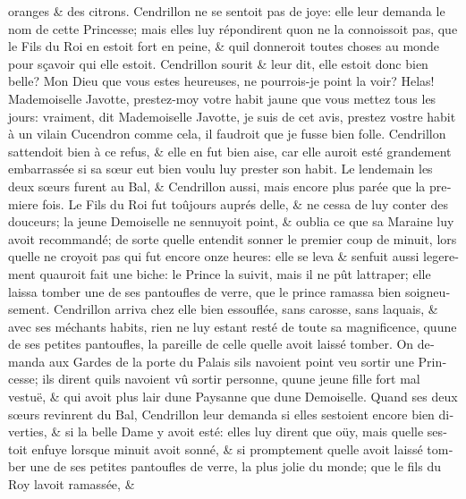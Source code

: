 \documentclass[14pt,a4paper]{memoir}
\begin{document}
\begin{otherlanguage}{french}
oranges \& des citrons. Cendrillon ne se sentoit pas de joye: elle leur
demanda le nom de cette Princesse; mais elles luy répondirent
qu\textquotesingle on ne la connoissoit pas, que le Fils du Roi en
estoit fort en peine, \& qu\textquotesingle il donneroit toutes choses
au monde pour sçavoir qui elle estoit. Cendrillon sourit \& leur dit,
elle estoit donc bien belle? Mon Dieu que vous estes heureuses, ne
pourrois-je point la voir? Helas! Mademoiselle Javotte, prestez-moy
votre habit jaune que vous mettez tous les jours: vraiment, dit
Mademoiselle Javotte, je suis de cet avis, prestez vostre habit à un
vilain Cucendron comme cela, il faudroit que je fusse bien folle.
Cendrillon s\textquotesingle attendoit bien à ce refus, \& elle en fut
bien aise, car elle auroit esté grandement embarrassée si sa sœur eut
bien voulu luy prester son habit. Le lendemain les deux sœurs furent au
Bal, \& Cendrillon aussi, mais encore plus parée que la premiere fois.
Le Fils du Roi fut toûjours auprés d\textquotesingle elle, \& ne cessa
de luy conter des douceurs; la jeune Demoiselle ne
s\textquotesingle ennuyoit point, \& oublia ce que sa Maraine luy avoit
recommandé; de sorte qu\textquotesingle elle entendit sonner le premier
coup de minuit, lors qu\textquotesingle elle ne croyoit pas qui fut
encore onze heures: elle se leva \& s\textquotesingle enfuit aussi
legerement qu\textquotesingle auroit fait une biche: le Prince la
suivit, mais il ne pût l\textquotesingle attraper; elle laissa tomber
une de ses pantoufles de verre, que le prince ramassa bien
soigneusement. Cendrillon arriva chez elle bien essouflée, sans carosse,
sans laquais, \& avec ses méchants habits, rien ne luy estant resté de
toute sa magnificence, qu\textquotesingle une de ses petites pantoufles,
la pareille de celle qu\textquotesingle elle avoit laissé tomber. On
demanda aux Gardes de la porte du Palais s\textquotesingle ils
n\textquotesingle avoient point veu sortir une Princesse; ils dirent
qu\textquotesingle ils n\textquotesingle avoient vû sortir personne,
qu\textquotesingle une jeune fille fort mal vestuë, \& qui avoit plus
l\textquotesingle air d\textquotesingle une Paysanne que
d\textquotesingle une Demoiselle. Quand ses deux sœurs revinrent du Bal,
Cendrillon leur demanda si elles s\textquotesingle estoient encore bien
diverties, \& si la belle Dame y avoit esté: elles luy dirent que oüy,
mais qu\textquotesingle elle s\textquotesingle estoit enfuye lorsque
minuit avoit sonné, \& si promptement qu\textquotesingle elle avoit
laissé tomber une de ses petites pantoufles de verre, la plus jolie du
monde; que le fils du Roy l\textquotesingle avoit ramassée, \&

\end{otherlanguage}
\end{document}
